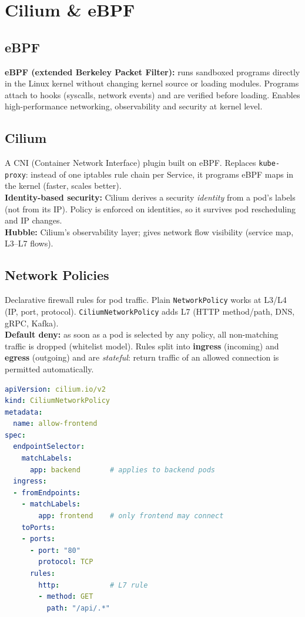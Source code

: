 \section{Cilium \& eBPF}
\subsection{eBPF}
\textbf{eBPF (extended Berkeley Packet Filter):} runs sandboxed programs directly in the Linux kernel without changing kernel source or loading modules. Programs attach to hooks (syscalls, network events) and are verified before loading. Enables high-performance networking, observability and security at kernel level.

\subsection{Cilium}
A CNI (Container Network Interface) plugin built on eBPF. Replaces \texttt{kube-proxy}: instead of one iptables rule chain per Service, it programs eBPF maps in the kernel (faster, scales better). \\
\textbf{Identity-based security:} Cilium derives a security \textit{identity} from a pod's labels (not from its IP). Policy is enforced on identities, so it survives pod rescheduling and IP changes. \\
\textbf{Hubble:} Cilium's observability layer; gives network flow visibility (service map, L3--L7 flows).

\subsection{Network Policies}
Declarative firewall rules for pod traffic. Plain \texttt{NetworkPolicy} works at L3/L4 (IP, port, protocol). \texttt{CiliumNetworkPolicy} adds L7 (HTTP method/path, DNS, gRPC, Kafka). \\
\textbf{Default deny:} as soon as a pod is selected by any policy, all non-matching traffic is dropped (whitelist model). Rules split into \textbf{ingress} (incoming) and \textbf{egress} (outgoing) and are \textit{stateful}: return traffic of an allowed connection is permitted automatically.
\begin{lstlisting}[language=yaml]
apiVersion: cilium.io/v2
kind: CiliumNetworkPolicy
metadata:
  name: allow-frontend
spec:
  endpointSelector:
    matchLabels:
      app: backend       # applies to backend pods
  ingress:
  - fromEndpoints:
    - matchLabels:
        app: frontend    # only frontend may connect
    toPorts:
    - ports:
      - port: "80"
        protocol: TCP
      rules:
        http:            # L7 rule
        - method: GET
          path: "/api/.*"
\end{lstlisting}
